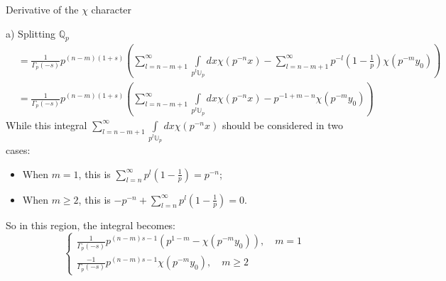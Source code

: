 \documentclass[12pt]{article}
\begin{document}
\begin{section}{Derivative of the $\chi$ character}
\begin{paragraph}{a) Splitting $\mathbb{Q}_p$}
\begin{equation}
\begin{split}
&=\frac{1}{\Gamma_p (-s)} p^{(n-m)(1+s)} (\sum_{l=n-m+1}^{\infty} \int\limits _{p^l \mathbb{U}_p}dx \chi( p^{-n} x) - \sum_{l=n-m+1}^{\infty} p^{-l}(1-\frac{1}{p})\chi( p^{-m}y_0))\\
&=\frac{1}{\Gamma_p (-s)} p^{(n-m)(1+s)} (\sum_{l=n-m+1}^{\infty} \int\limits _{p^l \mathbb{U}_p}dx \chi( p^{-n} x) - p^{-1+m-n}\chi( p^{-m}y_0))
\end{split}
\end{equation}
While this integral $\sum_{l=n-m+1}^{\infty}\int\limits _{p^l \mathbb{U}_p}dx \chi( p^{-n} x)$ should be considered in two cases: \\
\begin{itemize}
\item When $m=1$, this is $\sum^\infty_{l=n}p^l(1-\frac{1}{p})=p^{-n}$;
\item When $m\geq 2$, this is $-p^{-n}+\sum^\infty_{l=n}p^l(1-\frac{1}{p})=0$.
\end{itemize}
So in this region, the integral becomes:
\begin{equation}
\begin{cases}
\frac{1}{\Gamma_p (-s)} p^{(n-m)s-1} (p^{1-m} - \chi( p^{-m}y_0)), \quad m=1\\
\frac{-1}{\Gamma_p (-s)} p^{(n-m)s-1} \chi( p^{-m}y_0), \quad m\geq 2
\end{cases}
\end{equation}
\end{paragraph}

\end{section}
\end{document}
